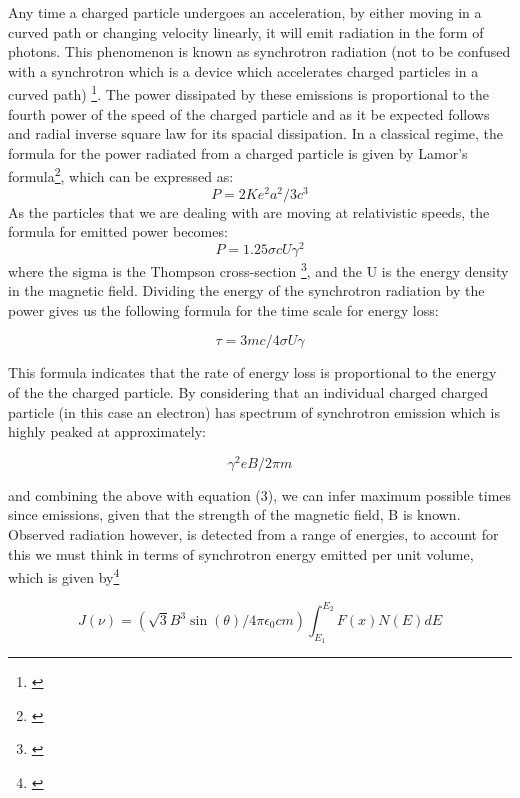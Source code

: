 \documentclass{article}
\begin{document}
Any time a charged particle undergoes an acceleration, by either moving in a curved path or changing velocity linearly, it will emit radiation in the form of photons. This phenomenon is known as synchrotron radiation (not to be confused with a synchrotron which is a device which accelerates charged particles in a curved path) \footnote{\cite{synch}}. The power dissipated by these emissions is proportional to the fourth power of the speed of the charged particle and as it be expected follows and radial inverse square law for its spacial dissipation.  In a classical regime, the formula for the power radiated from a charged particle is given by Lamor's formula\footnote{\cite{lamor}}, which can be expressed as:
\begin{equation}
   P = 2Ke^2a^2/3c^3
\end{equation}
As the particles that we are dealing with are moving at relativistic speeds, the formula for emitted power becomes:
\begin{equation}
    P = 1.25\sigma cU \gamma^2
\end{equation}
where the sigma is the Thompson cross-section \footnote{\cite{Thompson}}, and the U is the energy density in the magnetic field. Dividing the energy of the synchrotron radiation by the power gives us the following formula for the time scale for energy loss:

\begin{equation}
    \tau = 3mc/4 \sigma U \gamma    
\end{equation}

This formula indicates that the rate of energy loss is proportional to the energy of the the charged particle. By considering that an individual charged charged particle (in this case an electron) has spectrum of synchrotron emission which is highly peaked at approximately:

\begin{equation}
    \gamma^2 eB/2 \pi m
\end{equation}

and combining the above with equation (3), we can infer maximum possible times since emissions, given that the strength of the magnetic field, B is known. Observed radiation however, is detected from a range of energies, to account for this we must think in terms of synchrotron energy emitted per unit volume, which is given by\footnote{\cite{Hardcastle}}

\begin{equation}
    J(\nu) = (\sqrt{3}B^3\sin(\theta)/4\pi\epsilon_0cm) \int_{E_1}^{E_2} F(x)N(E) dE
\end{equation}
\end{document}
